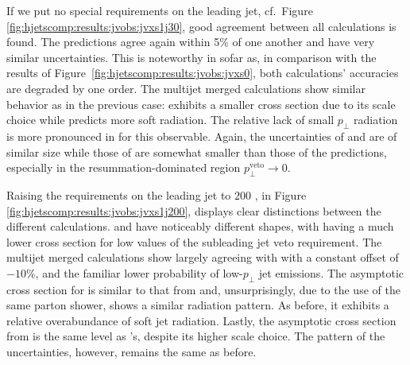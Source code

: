If we put no special requirements on the leading jet, cf.\ Figure 
\ref{fig:hjetscomp:results:jvobs:jvxs1j30}, good agreement 
between all calculations is found. The \NNLOPS predictions agree again within 
5\% of one another and have very similar uncertainties. This is noteworthy 
in sofar as, in comparison with the results of 
Figure~\ref{fig:hjetscomp:results:jvobs:jvxs0}, both calculations' 
accuracies are degraded by one order. The multijet merged calculations 
show similar behavior as in the previous case: \MGaMC exhibits a smaller cross section due to 
its scale choice while \Sherpa \MEPSatNLO predicts more soft radiation. 
The relative lack of small $p_\perp$ radiation is more 
pronounced in \Herwig for this observable. Again, the uncertainties of \MGaMC and \Sherpa 
are of similar size while those of \Herwig are somewhat smaller than those of the \NNLOPS 
predictions, especially in the resummation-dominated region 
$p_\perp^\text{veto}\to 0$.

Raising the requirements on the leading jet to $200$ \gev, in Figure 
\ref{fig:hjetscomp:results:jvobs:jvxs1j200}, displays clear distinctions 
between the different calculations.  
\Sherpa \NNLOPS and \Powheg \NNLOPS have noticeably different shapes, with \Sherpa having a 
much lower cross section for low values of the subleading jet veto requirement. 
The multijet merged calculations show \Herwig largely agreeing with 
\Powheg with a constant offset of $-10\%$, and the familiar lower 
probability of low-$p_\perp$ jet emissions. 
The asymptotic cross section for \Sherpa \MEPSatNLO is similar to that from \Sherpa \NNLOPS and, 
unsurprisingly, due to the use of the same parton shower, shows a 
similar radiation pattern. As before, it exhibits 
a relative overabundance of soft jet radiation. Lastly, the asymptotic cross section from \MGaMC 
is the same level as \Powheg's, despite 
its higher scale choice. The pattern of the uncertainties, however, 
remains the same as before.


